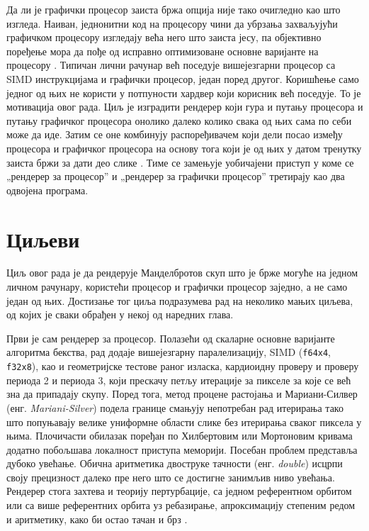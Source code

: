 \documentclass[serbian]{ftndiplomski}
\begin{document}
Да ли је графички процесор заиста бржа опција није тако очигледно као што изгледа.
Наиван, једнонитни код на процесору чини да убрзања захваљујући графичком процесору
изгледају већа него што заиста јесу, па објективно поређење мора да пође од исправно
оптимизоване основне варијанте на процесору \cite{lee2010debunking}. Типичан лични
рачунар већ поседује вишејезгарни процесор са SIMD инструкцијама и графички процесор,
један поред другог. Коришћење само једног од њих не користи у потпуности хардвер који
корисник већ поседује. То је мотивација овог рада. Циљ је изградити рендерер који гура и путању
процесора и путању графичког процесора онолико далеко колико свака од њих сама по себи
може да иде. Затим се оне комбинују распоређивачем који дели посао између процесора и
графичког процесора на основу тога који је од њих у датом тренутку заиста бржи за дати
део слике \cite{luk2009qilin}. Тиме се замењује уобичајени приступ у коме се
„рендерер за процесор'' и „рендерер за графички процесор'' третирају као два одвојена
програма.

\section{Циљеви}
\label{sec:goals}

Циљ овог рада је да рендерује Манделбротов скуп што је брже могуће на једном личном
рачунару, користећи процесор и графички процесор заједно, а не само један од њих.
Достизање тог циља подразумева рад на неколико мањих циљева, од којих је сваки обрађен
у некој од наредних глава.

Први је сам рендерер за процесор. Полазећи од скаларне основне варијанте алгоритма
бекства, рад додаје вишејезгарну паралелизацију, SIMD (\texttt{f64x4}, \texttt{f32x8}),
као и геометријске тестове раног изласка, кардиоидну проверу и проверу периода 2 и
периода 3, који прескачу петљу итерације за пикселе за које се већ зна да припадају
скупу. Поред тога, метод процене растојања и Мариани-Силвер (енг. \emph{Mariani-Silver})
подела границе смањују непотребан рад итерирања тако што попуњавају велике униформне
области слике без итерирања сваког пиксела у њима. Плочичасти обилазак поређан по
Хилбертовим или Мортоновим кривама додатно побољшава локалност приступа меморији.
Посебан проблем представља дубоко увећање. Обична аритметика двоструке тачности
(енг. \emph{double}) исцрпи своју прецизност далеко пре него што се достигне занимљив ниво
увећања. Рендерер стога захтева и теорију пертурбације, са једном референтном орбитом
или са више референтних орбита уз ребазирање, апроксимацију степеним редом и
 аритметику, како би остао тачан и брз \cite{heilandallen2021deepzoom}.
\end{document}
